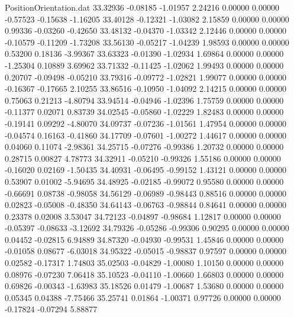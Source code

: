 \begin{filecontents}{PositionOrientation.dat}
  33.32936   -0.08185   -1.01957     2.24216    0.00000    0.00000   -0.57523   -0.15638   -1.16205
  33.40128   -0.12321   -1.03082     2.15859    0.00000    0.00000    0.99336   -0.03260   -0.42650
  33.48132   -0.04370   -1.03342     2.12446    0.00000    0.00000   -0.10579   -0.11209   -1.73208
  33.56130   -0.05217   -1.04239     1.98593    0.00000    0.00000    0.53200    0.18136   -3.99367
  33.63323   -0.01390   -1.02934     1.69864    0.00000    0.00000   -1.25304    0.10889    3.69962
  33.71332   -0.11425   -1.02062     1.99493    0.00000    0.00000    0.20707   -0.09498   -0.05210
  33.79316   -0.09772   -1.02821     1.99077    0.00000    0.00000   -0.16367   -0.17665    2.10255
  33.86516   -0.10950   -1.04092     2.14215    0.00000    0.00000    0.75063    0.21213   -4.80794
  33.94514   -0.04946   -1.02396     1.75759    0.00000    0.00000   -0.11377    0.02071    0.83739
  34.02545   -0.05860   -1.02229     1.82483    0.00000    0.00000   -0.19141    0.09292   -4.80070
  34.09737   -0.07236   -1.01561     1.47954    0.00000    0.00000   -0.04574    0.16163   -0.41860
  34.17709   -0.07601   -1.00272     1.44617    0.00000    0.00000    0.04060    0.11074   -2.98361
  34.25715   -0.07276   -0.99386     1.20732    0.00000    0.00000    0.28715    0.00827    4.78773
  34.32911   -0.05210   -0.99326     1.55186    0.00000    0.00000   -0.16020    0.02169   -1.50435
  34.40931   -0.06495   -0.99152     1.43121    0.00000    0.00000    0.53907    0.01002   -5.94695
  34.48925   -0.02185   -0.99072     0.95580    0.00000    0.00000   -0.66691    0.08738   -0.98058
  34.56129   -0.06989   -0.98443     0.88516    0.00000    0.00000    0.02823   -0.05008   -0.48350
  34.64143   -0.06763   -0.98844     0.84641    0.00000    0.00000    0.23378    0.02008    3.53047
  34.72123   -0.04897   -0.98684     1.12817    0.00000    0.00000   -0.05397   -0.08633   -3.12692
  34.79326   -0.05286   -0.99306     0.90295    0.00000    0.00000    0.04452   -0.02815    6.94889
  34.87320   -0.04930   -0.99531     1.45846    0.00000    0.00000   -0.01058    0.08677   -6.03018
  34.95322   -0.05015   -0.98837     0.97597    0.00000    0.00000    0.02582   -0.17317    1.74803
  35.02503   -0.04829   -1.00080     1.10150    0.00000    0.00000    0.08976   -0.07230    7.06418
  35.10523   -0.04110   -1.00660     1.66803    0.00000    0.00000    0.69826   -0.00343   -1.63983
  35.18526    0.01479   -1.00687     1.53680    0.00000    0.00000    0.05345    0.04388   -7.75466
  35.25741    0.01864   -1.00371     0.97726    0.00000    0.00000   -0.17824   -0.07294    5.88877

\end{filecontents}
